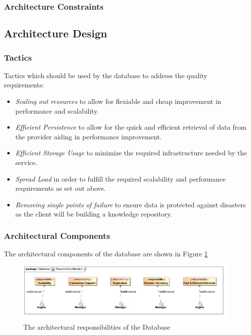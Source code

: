 \subsubsection{Architecture Constraints}
\subsection{Architecture Design}
\subsubsection{Tactics}
Tactics which should be used by the database to address the quality requirements:
\begin{itemize}
	\item \textit{Scaling out resources} to allow for flexiable and cheap
		improvement in performance and scalability.
	\item \textit{Efficient Persistence} to allow for the quick and efficient
		retrieval of data from the provider aiding in performance
		improvement.
	\item \textit{Efficient Storage Usage} to minimize the required
	infrastructure needed by the service.
	\item \textit{Spread Load} in order to fulfill the required scalability
		and performance requirements as set out above.
	\item \textit{Removing single points of failure} to ensure data is
		protected against disasters as the client will be building a
		knowledge repository.
\end{itemize}

\subsubsection{Architectural Components}
The architectural components of the database are shown in 
Figure \ref{fig:databaseResponsibilityAllocation}
\begin{figure}[H]
	\begin{center}
	\includegraphics[scale=0.5]{../Diagrams and Charts/Database/ResponsibilityAllocation.jpg}
	\caption{The architectural responsibilities of the Database}
	\label{fig:databaseResponsibilityAllocation}
	\end{center}
\end{figure}

